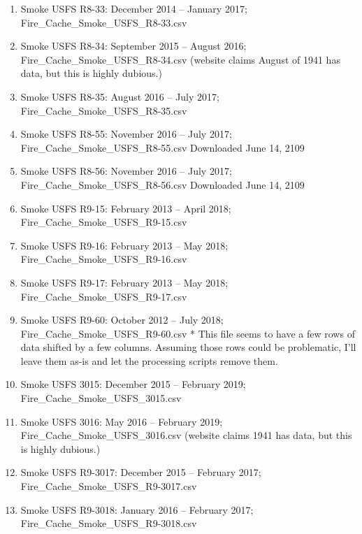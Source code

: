 \begin{enumerate}
\begin{enumerate}[nolistsep]
\item Smoke USFS R8-33: December 2014 -- January 2017; Fire\_Cache\_Smoke\_USFS\_R8-33.csv
\item Smoke USFS R8-34: September 2015 -- August 2016; Fire\_Cache\_Smoke\_USFS\_R8-34.csv (website claims August of 1941 has data, but this is highly dubious.)
\item Smoke USFS R8-35: August 2016 -- July 2017; Fire\_Cache\_Smoke\_USFS\_R8-35.csv
\item Smoke USFS R8-55: November 2016 -- July 2017; Fire\_Cache\_Smoke\_USFS\_R8-55.csv Downloaded June 14, 2109 %
\item Smoke USFS R8-56: November 2016 -- July 2017; Fire\_Cache\_Smoke\_USFS\_R8-56.csv Downloaded June 14, 2109 %
\item Smoke USFS R9-15: February 2013 -- April 2018;  Fire\_Cache\_Smoke\_USFS\_R9-15.csv
\item Smoke USFS R9-16: February 2013 -- May 2018; Fire\_Cache\_Smoke\_USFS\_R9-16.csv
\item Smoke USFS R9-17: February 2013 -- May 2018; Fire\_Cache\_Smoke\_USFS\_R9-17.csv
\item Smoke USFS R9-60: October 2012 -- July 2018; Fire\_Cache\_Smoke\_USFS\_R9-60.csv * This file seems to have a few rows of data shifted by a few columns. Assuming those rows could be problematic, I'll leave them as-is and let the processing scripts remove them.
\item Smoke USFS 3015: December 2015 -- February 2019; Fire\_Cache\_Smoke\_USFS\_3015.csv
\item Smoke USFS 3016: May 2016 -- February 2019; Fire\_Cache\_Smoke\_USFS\_3016.csv (website claims 1941 has data, but this is highly dubious.)
\item Smoke USFS R9-3017: December 2015 -- February 2017; Fire\_Cache\_Smoke\_USFS\_R9-3017.csv
\item Smoke USFS R9-3018: January 2016 -- February 2017; Fire\_Cache\_Smoke\_USFS\_R9-3018.csv
\end{enumerate}


\end{enumerate}
